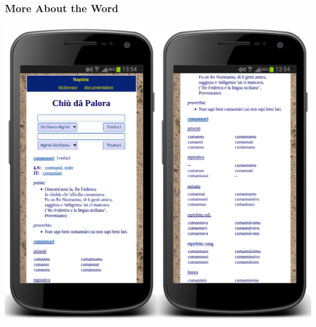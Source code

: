 \documentclass{beamer}
\begin{document}
\begin{frame}
  \frametitle{More About the Word}
  \vspace{-1.25em}
  \begin{center}
    \includegraphics[height=0.795\textheight]{images/cdp_cumannari_v2.png}
  \end{center}
\end{frame}


\end{document}
